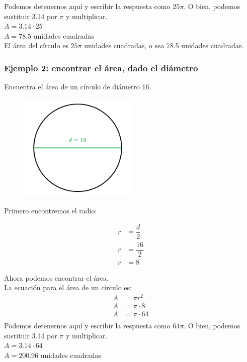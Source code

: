 \documentclass[11pt]{book}
\begin{document}
Podemos detenernos aquí y escribir la respuesta como $25\pi$. O bien, podemos sustituir 3.14 por $\pi$ y multiplicar.\\
$A = 3.14 \cdot 25$\\
$A = 78.5$ unidades cuadradas\\
El área del círculo es $25\pi$ unidades cuadradas, o sea 78.5 unidades cuadradas.
\subsubsection{Ejemplo 2: encontrar el área, dado el diámetro}
Encuentra el área de un círculo de diámetro 16.
\begin{figure}[H]
  \centering
  \includegraphics[width=0.5\textwidth]{./Unidad 2/Images/figS10_002.png}
\end{figure}
Primero encontremos el radio:

\begin{align*}
  r & = \dfrac d2     \\
  r & = \dfrac{16}{2} \\
  r & = 8
\end{align*}

Ahora podemos encontrar el área.\\

La ecuación para el área de un círculo es:
\begin{align*}
  A & = \pi r^2      \\
  A & = \pi \cdot 8  \\
  A & = \pi \cdot 64 \\
\end{align*}
Podemos detenernos aquí y escribir la respuesta como $64\pi$. O bien, podemos sustituir 3.14 por $\pi$ y multiplicar.\\
$A = 3.14 \cdot 64$\\
$A = 200.96$ unidades cuadradas\\
\end{document}
